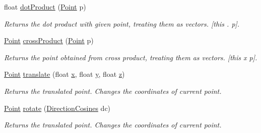 \begin{DoxyCompactItemize}
float \mbox{\hyperlink{class_point_acf25ade0104bfa1c292eeb2da4d5aa2c}{dot\+Product}} (\mbox{\hyperlink{class_point}{Point}} p)
\begin{DoxyCompactList}\small\item\em Returns the dot product with given point, treating them as vectors. \mbox{[}this . p\mbox{]}. \end{DoxyCompactList}\item 
\mbox{\hyperlink{class_point}{Point}} \mbox{\hyperlink{class_point_a99b9491fe4a5527eff77a2db8bd01ecf}{cross\+Product}} (\mbox{\hyperlink{class_point}{Point}} p)
\begin{DoxyCompactList}\small\item\em Returns the point obtained from cross product, treating them as vectors. \mbox{[}this x p\mbox{]}. \end{DoxyCompactList}\item 
\mbox{\hyperlink{class_point}{Point}} \mbox{\hyperlink{class_point_acf38257ee8ba425115bab283b777ad17}{translate}} (float \mbox{\hyperlink{class_point_a05dfe2dfbde813ad234b514f30e662f1}{x}}, float \mbox{\hyperlink{class_point_a6101960c8d2d4e8ea1d32c9234bbeb8d}{y}}, float \mbox{\hyperlink{class_point_a9a666531e0e99adff132be93d2407d0c}{z}})
\begin{DoxyCompactList}\small\item\em Returns the translated point. Changes the coordinates of current point. \end{DoxyCompactList}\item 
\mbox{\hyperlink{class_point}{Point}} \mbox{\hyperlink{class_point_a3f42404773430a36407ee22224518f39}{rotate}} (\mbox{\hyperlink{class_direction_cosines}{Direction\+Cosines}} dc)
\begin{DoxyCompactList}\small\item\em Returns the translated point. Changes the coordinates of current point. \end{DoxyCompactList}\end{DoxyCompactItemize}
